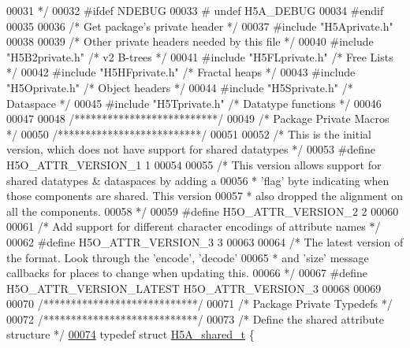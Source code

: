 \begin{DoxyCode}
00031 \textcolor{comment}{ */}
00032 \textcolor{preprocessor}{#ifdef NDEBUG}
00033 \textcolor{preprocessor}{#  undef H5A\_DEBUG}
00034 \textcolor{preprocessor}{#endif}
00035 
00036 \textcolor{comment}{/* Get package's private header */}
00037 \textcolor{preprocessor}{#include "H5Aprivate.h"}
00038 
00039 \textcolor{comment}{/* Other private headers needed by this file */}
00040 \textcolor{preprocessor}{#include "H5B2private.h"}    \textcolor{comment}{/* v2 B-trees               */}
00041 \textcolor{preprocessor}{#include "H5FLprivate.h"}    \textcolor{comment}{/* Free Lists               */}
00042 \textcolor{preprocessor}{#include "H5HFprivate.h"}    \textcolor{comment}{/* Fractal heaps            */}
00043 \textcolor{preprocessor}{#include "H5Oprivate.h"}     \textcolor{comment}{/* Object headers           */}
00044 \textcolor{preprocessor}{#include "H5Sprivate.h"}     \textcolor{comment}{/* Dataspace                */}
00045 \textcolor{preprocessor}{#include "H5Tprivate.h"}     \textcolor{comment}{/* Datatype functions           */}
00046 
00047 
00048 \textcolor{comment}{/**************************/}
00049 \textcolor{comment}{/* Package Private Macros */}
00050 \textcolor{comment}{/**************************/}
00051 
00052 \textcolor{comment}{/* This is the initial version, which does not have support for shared datatypes */}
00053 \textcolor{preprocessor}{#define H5O\_ATTR\_VERSION\_1  1}
00054 
00055 \textcolor{comment}{/* This version allows support for shared datatypes & dataspaces by adding a}
00056 \textcolor{comment}{ *      'flag' byte indicating when those components are shared.  This version}
00057 \textcolor{comment}{ *      also dropped the alignment on all the components.}
00058 \textcolor{comment}{ */}
00059 \textcolor{preprocessor}{#define H5O\_ATTR\_VERSION\_2  2}
00060 
00061 \textcolor{comment}{/* Add support for different character encodings of attribute names */}
00062 \textcolor{preprocessor}{#define H5O\_ATTR\_VERSION\_3      3}
00063 
00064 \textcolor{comment}{/* The latest version of the format.  Look through the 'encode', 'decode'}
00065 \textcolor{comment}{ *      and 'size' message callbacks for places to change when updating this.}
00066 \textcolor{comment}{ */}
00067 \textcolor{preprocessor}{#define H5O\_ATTR\_VERSION\_LATEST H5O\_ATTR\_VERSION\_3}
00068 
00069 
00070 \textcolor{comment}{/****************************/}
00071 \textcolor{comment}{/* Package Private Typedefs */}
00072 \textcolor{comment}{/****************************/}
00073 \textcolor{comment}{/* Define the shared attribute structure */}
\hyperlink{struct_h5_a__shared__t}{00074} \textcolor{keyword}{typedef} \textcolor{keyword}{struct }\hyperlink{struct_h5_a__shared__t}{H5A\_shared\_t} \{

\end{DoxyCode}
